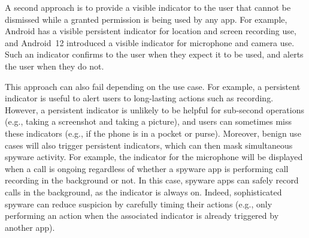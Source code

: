  






A second approach is to provide a visible indicator to the user that cannot be
dismissed while a granted permission is being used by any app.  For example,
Android has a visible persistent indicator for location and screen recording
use, and Android~12 introduced a visible indicator for microphone and camera
use. Such an indicator confirms to the user when they expect it to be used, and
alerts the user when they do not.

This approach can also fail depending on the use case.  For example, a
persistent indicator is useful to alert users to long-lasting actions
such as recording. However, a persistent indicator is unlikely to be
helpful for sub-second operations (e.g., taking a screenshot and
taking a picture),
and users can sometimes miss these indicators (e.g., if the phone is
in a pocket or purse).  Moreover, benign use cases will also trigger
persistent indicators, which can then mask simultaneous spyware activity.  For example, the indicator for the microphone will be
displayed when a call is ongoing regardless of whether a spyware app
is performing call recording in the background or not.  In this case,
spyware apps can safely record calls in the background, as the
indicator is always on.  Indeed, sophisticated spyware can reduce
suspicion by carefully timing their actions (e.g., only performing an
action when the associated indicator is already triggered by another
app).

